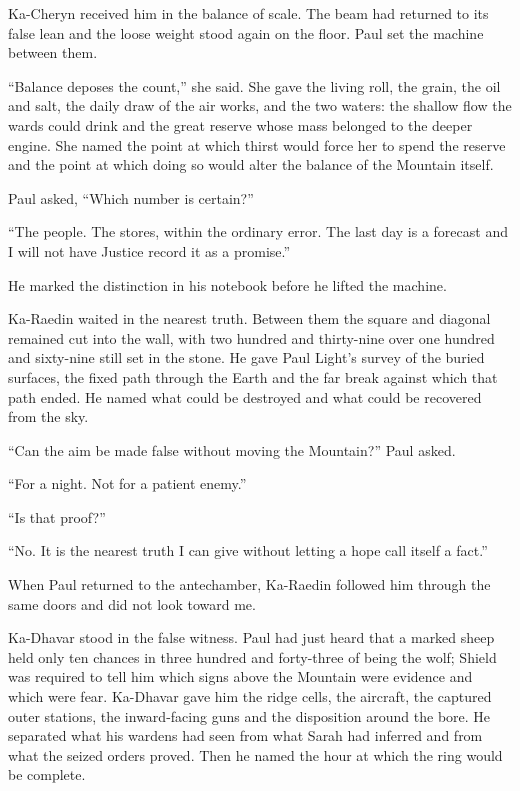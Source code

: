 Ka-Cheryn received him in the balance of scale. The beam had returned to its false lean and the loose weight stood again on the floor. Paul set the machine between them.\par

``Balance deposes the count,'' she said. She gave the living roll, the grain, the oil and salt, the daily draw of the air works, and the two waters: the shallow flow the wards could drink and the great reserve whose mass belonged to the deeper engine. She named the point at which thirst would force her to spend the reserve and the point at which doing so would alter the balance of the Mountain itself.\par

Paul asked, ``Which number is certain?''\par

``The people. The stores, within the ordinary error. The last day is a forecast and I will not have Justice record it as a promise.''\par

He marked the distinction in his notebook before he lifted the machine.\par

Ka-Raedin waited in the nearest truth. Between them the square and diagonal remained cut into the wall, with two hundred and thirty-nine over one hundred and sixty-nine still set in the stone. He gave Paul Light's survey of the buried surfaces, the fixed path through the Earth and the far break against which that path ended. He named what could be destroyed and what could be recovered from the sky.\par

``Can the aim be made false without moving the Mountain?'' Paul asked.\par

``For a night. Not for a patient enemy.''\par

``Is that proof?''\par

``No. It is the nearest truth I can give without letting a hope call itself a fact.''\par

When Paul returned to the antechamber, Ka-Raedin followed him through the same doors and did not look toward me.\par

Ka-Dhavar stood in the false witness. Paul had just heard that a marked sheep held only ten chances in three hundred and forty-three of being the wolf; Shield was required to tell him which signs above the Mountain were evidence and which were fear. Ka-Dhavar gave him the ridge cells, the aircraft, the captured outer stations, the inward-facing guns and the disposition around the bore. He separated what his wardens had seen from what Sarah had inferred and from what the seized orders proved. Then he named the hour at which the ring would be complete.\par

